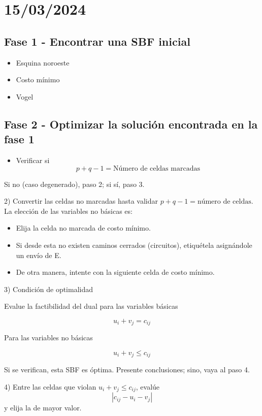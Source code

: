 \documentclass{article}
\begin{document}
\section{15/03/2024}
\subsection*{Fase 1 - Encontrar una SBF inicial}

\begin{itemize}
    \item Esquina noroeste
    \item Costo mínimo
    \item Vogel
\end{itemize}

\subsection*{Fase 2 - Optimizar la solución encontrada en la fase 1}

\begin{itemize}
    \item Verificar si
          \[p + q - 1 = \text{Número de celdas marcadas}\]
\end{itemize}

Si no (caso degenerado), paso 2; si sí, paso 3.

2) Convertir las celdas no marcadas hasta validar \(p + q - 1 = \text{número de celdas}\). La elección de las variables no básicas es:

\begin{itemize}
    \item Elija la celda no marcada de costo mínimo.
    \item Si desde esta no existen caminos cerrados (circuitos), etiquétela asignándole un envío de E.
    \item De otra manera, intente con la siguiente celda de costo mínimo.
\end{itemize}

3) Condición de optimalidad

Evalue la factibilidad del dual para las variables básicas

\[u_i + v_j = c_{ij}\]

Para las variables no básicas

\[u_i + v_j \leq c_{ij}\]

Si se verifican, esta SBF es óptima. Presente conclusiones; sino, vaya al paso 4.

4) Entre las celdas que violan \(u_i + v_j \leq c_{ij}\), evalúe
\[|c_{ij} - u_i - v_j|\] y elija la de mayor valor.
\end{document}
